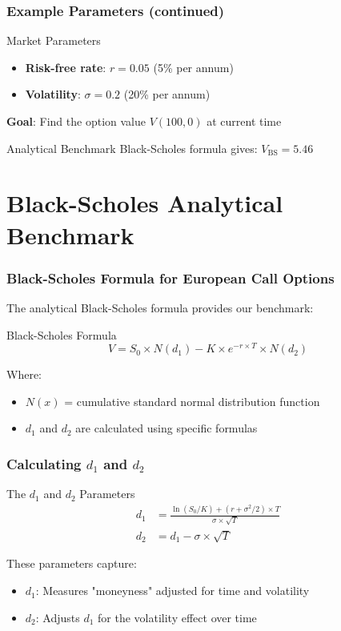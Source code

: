 \documentclass[aspectratio=169]{beamer}
\begin{document}
\begin{frame}
\frametitle{Example Parameters (continued)}
\begin{block}{Market Parameters}
\begin{itemize}
\item \textbf{Risk-free rate}: $r = 0.05$ (5\% per annum)
\item \textbf{Volatility}: $\sigma = 0.2$ (20\% per annum)
\end{itemize}
\end{block}

\textbf{Goal}: Find the option value $V(100, 0)$ at current time

\begin{block}{Analytical Benchmark}
Black-Scholes formula gives: $V_{\text{BS}} = 5.46$
\end{block}
\end{frame}

\section{Black-Scholes Analytical Benchmark}

\begin{frame}
\frametitle{Black-Scholes Formula for European Call Options}
The analytical Black-Scholes formula provides our benchmark:

\begin{block}{Black-Scholes Formula}
\[V = S_0 \times N(d_1) - K \times e^{-r \times T} \times N(d_2)\]
\end{block}

Where:
\begin{itemize}
\item $N(x)$ = cumulative standard normal distribution function
\item $d_1$ and $d_2$ are calculated using specific formulas
\end{itemize}
\end{frame}

\begin{frame}
\frametitle{Calculating $d_1$ and $d_2$}
\begin{block}{The $d_1$ and $d_2$ Parameters}
\begin{align}
d_1 &= \frac{\ln(S_0/K) + (r + \sigma^2/2) \times T}{\sigma \times \sqrt{T}} \\
d_2 &= d_1 - \sigma \times \sqrt{T}
\end{align}
\end{block}

These parameters capture:
\begin{itemize}
\item \textbf{$d_1$}: Measures "moneyness" adjusted for time and volatility
\item \textbf{$d_2$}: Adjusts $d_1$ for the volatility effect over time
\end{itemize}
\end{frame}
\end{document}

